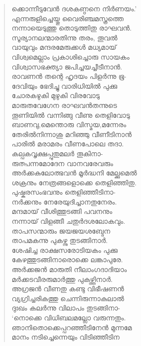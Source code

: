 \begin{verse}
ക്കൊന്നീടുവേന്‍ ദശകണ്ഠനെ നിര്‍ണയം.’\\
എന്നരുളിച്ചെയ്തു വൈരിഞ്ചമസ്ത്രത്തെ\\
നന്നായെടുത്തു തൊടുത്തിതു രാഘവന്‍.\\
സൂര്യാനലന്മാരതിന്നു തരം, തൂവല്‍\\
വായുവും മന്ദരമേരുക്കള്‍ മധ്യമായ്\\
വിശ്വമെല്ലാം പ്രകാശിച്ചൊരു സായകം\\
വിശ്വാസഭക്ത്യാ ജപിച്ചയച്ചീടീനാന്‍.\\
രാവണന്‍ തന്റെ ഹൃദയം പിളര്‍ന്നു ഭൂ-\\
ദേവിയും ഭേദിച്ചു വാരിധിയില്‍ പുക്കു\\
ചോരകഴുകി മുഴുകി വിരവോടു\\
മാരുതവേഗേന രാഘവന്‍തന്നുടെ\\
തൂണിയില്‍ വന്നിങ്ങു വീണു തെളിവോടു\\
ബാണവു,മെന്തൊരു വിസ്മയ,മന്നേരം\\
തേരില്‍നിന്നാശു മറിഞ്ഞു വീണീടിനാന്‍\\
പാരില്‍ മരാമരം വീണപോലെ തദാ.\\
കല്പകവൃക്ഷപ്പുതുമലര്‍ തൂകിനാ-\\
രുത്പന്നമോദേന വാനവരേവരും\\
അര്‍ക്കകുലോത്ഭവന്‍ മൂര്‍ദ്ധനി മേല്ക്കുമെല്‍\\
ശക്രനും നേത്രങ്ങളൊക്കെ തെളിഞ്ഞിതു.\\
പുഷ്കരസംഭവനും തെളിഞ്ഞീടിനാ-\\
നര്‍ക്കനും നേരേയുദിച്ചാനതുനേരം.\\
മന്ദമായ് വീശിത്തുടങ്ങി പവനനും\\
നന്നായ് വിളങ്ങീ ചതുര്‍ദശലോകവും.\\
താപസന്മാരും ജയജയശബ്ദേന\\
താപമകന്നു പുകഴ്ന്നു തുടങ്ങിനാര്‍.\\
ശേഷിച്ച രാക്ഷസരോടിയകം പുക്കു\\
കേഴത്തുടങ്ങിനാരൊക്കെ ലങ്കാപുരേ.\\
അര്‍ക്കജന്‍ മാരുതി നീലാംഗദാദിയാം\\
മര്‍ക്കടവീരരുമാര്‍ത്തു പുകഴ്ത്തിനാര്‍.\\
അഗ്രജന്‍ വീണതു കണ്ടു വിഭീഷണന്‍\\
വ്യഗ്രിച്ചരികത്തു ചെന്നിരുന്നാകുലാല്‍\\
ദുഃഖം കലര്‍ന്നു വിലാപം തുടങ്ങിനാ-\\
‘നൊക്കെ വിധിബലമല്ലോ വരുന്നതും.\\
ഞാനിതൊക്കെപ്പറഞ്ഞീടിനേന്‍ മുന്നമേ\\
മാനം നടിച്ചെന്നെയും വിടിഞ്ഞീടിന\\

\end{verse}
